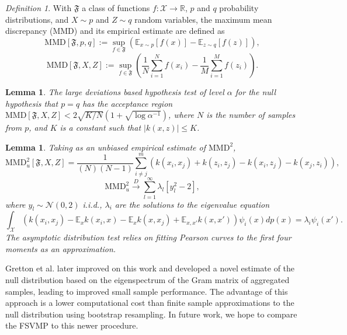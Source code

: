 \documentclass{article} %
\newtheorem{lem}[thm]{Lemma}
\theoremstyle{remark}
\newtheorem{mydef}{Definition}
\begin{document}
\begin{mydef}
  With $\mathfrak{F}$ a class of functions $f:\mathcal{X} \to
  \mathbb{R}$, $p$ and $q$ probability distributions, and $X \sim p$
  and $Z \sim q$ random variables, the maximum mean discrepancy (MMD)
  and its empirical estimate are defined as 
  \begin{equation}
    \text{MMD}[\mathfrak{F},p,q] := \sup_{f\in
      \mathfrak{F}}(\mathbb{E}_{x\sim p}[f(x)] - \mathbb{E}_{z\sim q}[f(z)]),
  \end{equation}
  \begin{equation}
    \text{MMD}[\mathfrak{F},X,Z] := \sup_{f\in
      \mathfrak{F}}(\frac{1}{N}\sum_{i=1}^Nf(x_i) -
    \frac{1}{M}\sum_{i=1}^M f(z_i)).
  \end{equation}
\end{mydef}

\begin{lem}
  The large deviations based hypothesis test of level $\alpha$ for the
  null hypothesis that $p=q$ has the acceptance region
  $\text{MMD}[\mathfrak{F},X,Z] <
  2\sqrt{K/N}(1+\sqrt{\log\alpha^{-1}})$, where $N$ is the number of
  samples from $p$, and $K$ is a constant such that $|k(x,z)|\leq K$.
\end{lem}

\begin{lem}
  Taking as an unbiased empirical estimate of $\text{MMD}^2$,
  \begin{equation}
    \text{MMD}_u^2[\mathfrak{F},X,Z]=\frac{1}{(N)(N-1)} \sum_{i\neq j}^m(k(x_i,x_j)+k(z_i,z_j)-k(x_i,z_j)-k(x_j,z_i)),
  \end{equation}
  \begin{equation}
    \text{MMD}_u^2 \overset{D}{\rightarrow} \sum_{l=1}^\infty \lambda_l[y_l^2-2],
  \end{equation}
  where $y_l \sim \mathcal{N}(0,2)$ i.i.d., $\lambda_i$ are the
  solutions to the eigenvalue equation 
  \begin{equation}
    \int_{\mathcal{X}}(k(x_i,x_j)-\mathbb{E}_xk(x_i,x)-\mathbb{E}_xk(x,x_j)+\mathbb{E}_{x,x'}k(x,x'))\psi_i(x)dp(x)=\lambda_i\psi_i(x').
  \end{equation}
  The asymptotic distribution test relies on fitting Pearson curves to
  the first four moments as an approximation.  
\end{lem}

Gretton et al. \cite{gretton2010fast} later improved on this work and
developed a novel estimate of the null distribution based on the
eigenspectrum of the Gram matrix of aggregated samples, leading to
improved small sample performance.  The advantage of this approach is
a lower computational cost than finite sample approximations to the
null distribution using bootstrap resampling.  
In future work, we hope to compare the FSVMP to this newer procedure.  
\end{document}
